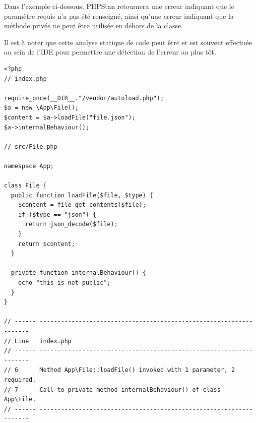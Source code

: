 Dans l'exemple ci-dessous, PHPStan retournera une erreur indiquant que le paramètre requis  n'a pas été renseigné, ainsi qu'une erreur indiquant que la méthode privée  ne peut être utilisée en dehors de la classe. 

Il est à noter que cette analyse statique de code peut être et est souvent effectuée au sein de l'\gls{IDE} pour permettre une détection de l'erreur au plus tôt.

\begin{verbatim}
<?php
// index.php

require_once(__DIR__."/vendor/autoload.php");
$a = new \App\File();
$content = $a->loadFile("file.json");
$a->internalBehaviour();

// src/File.php

namespace App;

class File {
  public function loadFile($file, $type) {
    $content = file_get_contents($file);
    if ($type == "json") {
      return json_decode($file);
    }
    return $content;
  }
  
  private function internalBehaviour() {
    echo "this is not public";
  }
}

// ------ ------------------------------------------------------------------- 
// Line   index.php                                                          
// ------ ------------------------------------------------------------------- 
// 6      Method App\File::loadFile() invoked with 1 parameter, 2 required.  
// 7      Call to private method internalBehaviour() of class App\File.      
// ------ ------------------------------------------------------------------- 

\end{verbatim}
\label{annexe:php-error}
